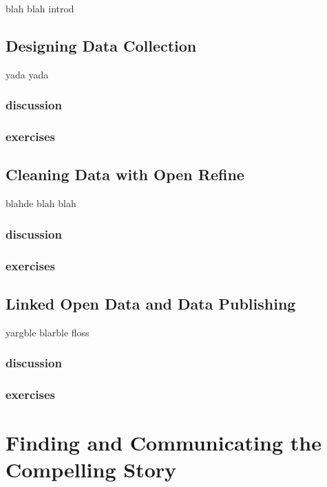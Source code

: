 \documentclass[english,]{book}
\begin{document}
blah blah introd

\section{Designing Data Collection}\label{designing-data-collection}

yada yada

\subsection{discussion}\label{discussion-2}

\subsection{exercises}\label{exercises-7}

\section{Cleaning Data with Open
Refine}\label{cleaning-data-with-open-refine}

blahde blah blah

\subsection{discussion}\label{discussion-3}

\subsection{exercises}\label{exercises-8}

\section{Linked Open Data and Data
Publishing}\label{linked-open-data-and-data-publishing}

yargble blarble floss

\subsection{discussion}\label{discussion-4}

\subsection{exercises}\label{exercises-9}

\chapter{Finding and Communicating the Compelling
Story}\label{finding-and-communicating-the-compelling-story}
\end{document}
